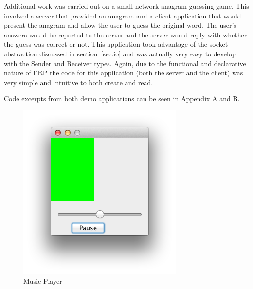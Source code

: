     Additional work was carried out on a small network anagram guessing game. This involved a server that provided
    an anagram and a client application that would present the anagram and allow the user to guess the original
    word. The user's answers would be reported to the server and the server would reply with whether
    the guess was correct or not. This application took advantage of the socket abstraction discussed in section~\ref{sec:io}
    and was actually very easy to develop with the Sender and Receiver types. Again, due to the functional and
    declarative nature of FRP the code for this application (both the server and the client) was very simple
    and intuitive to both create and read.
    
    Code excerpts from both demo applications can be seen in Appendix A and B. 
    
    \begin{figure}
      \includegraphics[width=\linewidth]{images/music-player.png}
      \caption{Music Player}
      \label{music_player}
    \end{figure}